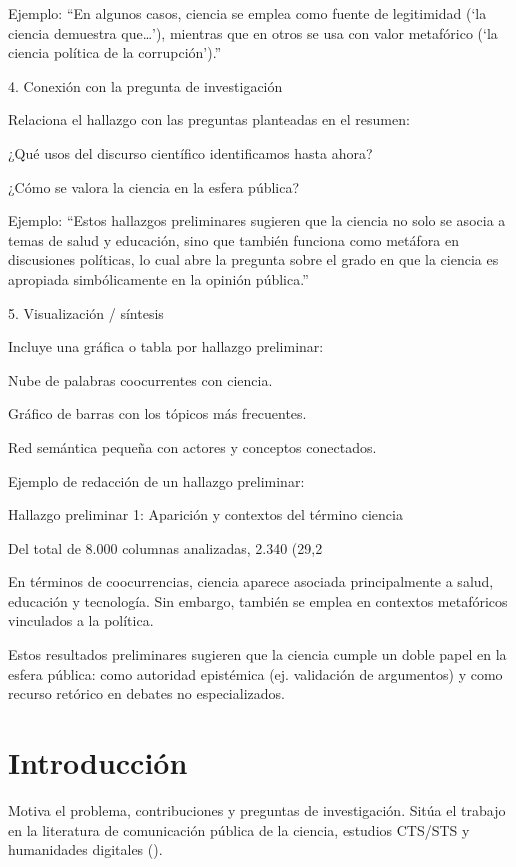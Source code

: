 \documentclass[11pt,a4paper]{article}
\begin{document}
	Ejemplo:
	“En algunos casos, ciencia se emplea como fuente de legitimidad (‘la ciencia demuestra que…’), mientras que en otros se usa con valor metafórico (‘la ciencia política de la corrupción’).”
	
	4. Conexión con la pregunta de investigación
	
	Relaciona el hallazgo con las preguntas planteadas en el resumen:
	
	¿Qué usos del discurso científico identificamos hasta ahora?
	
	¿Cómo se valora la ciencia en la esfera pública?
	
	Ejemplo:
	“Estos hallazgos preliminares sugieren que la ciencia no solo se asocia a temas de salud y educación, sino que también funciona como metáfora en discusiones políticas, lo cual abre la pregunta sobre el grado en que la ciencia es apropiada simbólicamente en la opinión pública.”
	
	5. Visualización / síntesis
	
	Incluye una gráfica o tabla por hallazgo preliminar:
	
	Nube de palabras coocurrentes con ciencia.
	
	Gráfico de barras con los tópicos más frecuentes.
	
	Red semántica pequeña con actores y conceptos conectados.
	
	Ejemplo de redacción de un hallazgo preliminar:
	
	Hallazgo preliminar 1: Aparición y contextos del término ciencia
	
	Del total de 8.000 columnas analizadas, 2.340 (29,2%
	
	En términos de coocurrencias, ciencia aparece asociada principalmente a salud, educación y tecnología. Sin embargo, también se emplea en contextos metafóricos vinculados a la política.
	
	Estos resultados preliminares sugieren que la ciencia cumple un doble papel en la esfera pública: como autoridad epistémica (ej. validación de argumentos) y como recurso retórico en debates no especializados.
	
	\section{Introducción}
	Motiva el problema, contribuciones y preguntas de investigación. Sitúa el trabajo en la literatura de comunicación pública de la ciencia, estudios CTS/STS y humanidades digitales (\citealp{BIBkey1,BIBkey2}).
	
\end{document}
